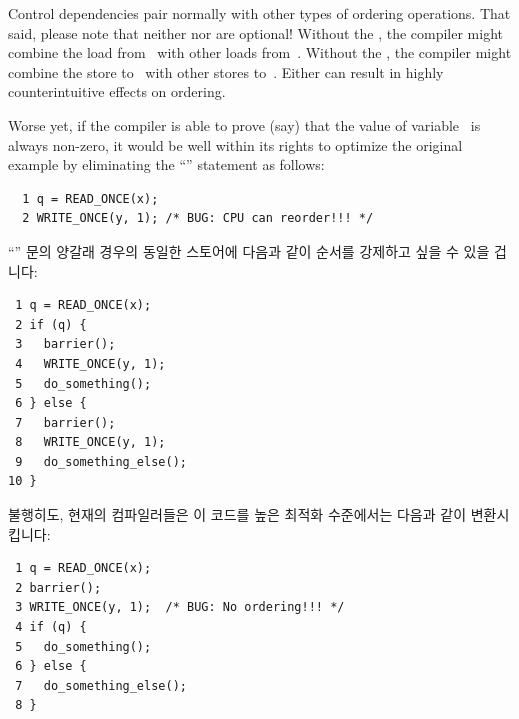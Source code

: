 Control dependencies pair normally with other types of ordering operations.
That said, please note that neither  nor 
are optional!
Without the , the compiler might combine the load
from~ with other loads from~.
Without the , the compiler might combine the store
to~ with other stores to~.
Either can result in highly counterintuitive effects on ordering.

Worse yet, if the compiler is able to prove (say) that the value of
variable~ is always non-zero, it would be well within its rights
to optimize the original example by eliminating the ``'' statement
as follows:
\fi

\vspace{5pt}
\begin{minipage}[t]{\columnwidth}
\scriptsize
\begin{verbatim}
  1 q = READ_ONCE(x);
  2 WRITE_ONCE(y, 1); /* BUG: CPU can reorder!!! */
\end{verbatim}
\end{minipage}
\vspace{5pt}

``'' 문의 양갈래 경우의 동일한 스토어에 다음과 같이 순서를 강제하고 싶을
수 있을 겁니다:

\vspace{5pt}
\begin{minipage}[t]{\columnwidth}
\scriptsize
\begin{verbatim}
 1 q = READ_ONCE(x);
 2 if (q) {
 3   barrier();
 4   WRITE_ONCE(y, 1);
 5   do_something();
 6 } else {
 7   barrier();
 8   WRITE_ONCE(y, 1);
 9   do_something_else();
10 }
\end{verbatim}
\end{minipage}
\vspace{5pt}

불행히도, 현재의 컴파일러들은 이 코드를 높은 최적화 수준에서는 다음과 같이
변환시킵니다:

\vspace{5pt}
\begin{minipage}[t]{\columnwidth}
\scriptsize
\begin{verbatim}
 1 q = READ_ONCE(x);
 2 barrier();
 3 WRITE_ONCE(y, 1);  /* BUG: No ordering!!! */
 4 if (q) {
 5   do_something();
 6 } else {
 7   do_something_else();
 8 }
\end{verbatim}
\end{minipage}
\vspace{5pt}

